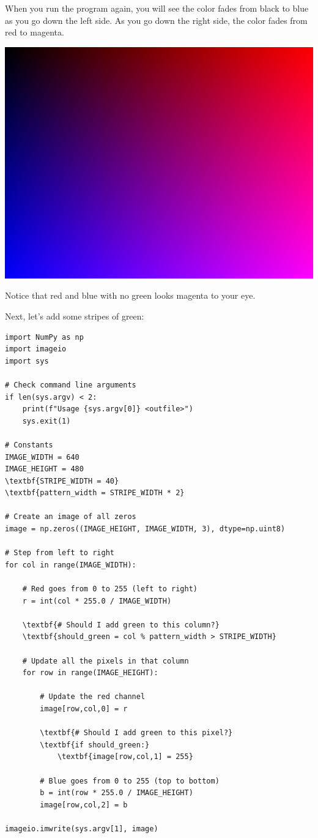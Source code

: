 When you run the program again, you will see the color fades from
black to blue as you go down the left side. As you go down the right
side, the color fades from red to magenta.

\includegraphics[width=0.4\linewidth]{rb.png}

Notice that red and blue with no green looks magenta to your eye.

Next, let's add some stripes of green:

\begin{Verbatim}[commandchars=\\\{\}]
import NumPy as np
import imageio
import sys

# Check command line arguments
if len(sys.argv) < 2:
    print(f"Usage {sys.argv[0]} <outfile>")
    sys.exit(1)

# Constants
IMAGE_WIDTH = 640
IMAGE_HEIGHT = 480
\textbf{STRIPE_WIDTH = 40}
\textbf{pattern_width = STRIPE_WIDTH * 2}

# Create an image of all zeros
image = np.zeros((IMAGE_HEIGHT, IMAGE_WIDTH, 3), dtype=np.uint8)

# Step from left to right
for col in range(IMAGE_WIDTH):

    # Red goes from 0 to 255 (left to right)
    r = int(col * 255.0 / IMAGE_WIDTH)

    \textbf{# Should I add green to this column?}
    \textbf{should_green = col % pattern_width > STRIPE_WIDTH}

    # Update all the pixels in that column
    for row in range(IMAGE_HEIGHT):

        # Update the red channel
        image[row,col,0] = r

        \textbf{# Should I add green to this pixel?}
        \textbf{if should_green:}
            \textbf{image[row,col,1] = 255}

        # Blue goes from 0 to 255 (top to bottom)
        b = int(row * 255.0 / IMAGE_HEIGHT)
        image[row,col,2] = b

imageio.imwrite(sys.argv[1], image)
\end{Verbatim}

